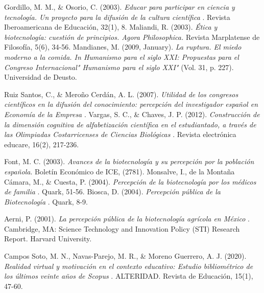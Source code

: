 \documentclass[12pt]{article}
\begin{document}
\newpage
{}
\begin{thebibliography}{X}
	 Gordillo, M. M., \& Osorio, C. (2003). \textit{ Educar para participar en ciencia y tecnología. Un proyecto para la difusión de la cultura científica }. Revista Iberoamericana de Educación, 32(1), 8.
	 Maliandi, R. (2003). \textit{ Ética y biotecnología: cuestión de principios. Agora Philosophica. } Revista Marplatense de Filosofía, 5(6), 34-56.
	 Mandianes, M. (2009, January). \textit{ La ruptura. El miedo moderno a la comida. In Humanismo para el siglo XXI: Propuestas para el Congreso Internacional" Humanismo para el siglo XXI" } (Vol. 31, p. 227). Universidad de Deusto.
	
	Ruiz Santos, C., \& Meroño Cerdán, A. L. (2007). \textit{ Utilidad de los congresos científicos en la difusión del conocimiento: percepción del investigador español en Economía de la Empresa }.
	Vargas, S. C., \& Chaves, J. P. (2012). \textit{ Construcción de la dimensión cognitiva de alfabetización científica en el estudiantado, a través de las Olimpiadas Costarricenses de Ciencias Biológicas }. Revista electrónica educare, 16(2), 217-236.
	
	Font, M. C. (2003). \textit{ Avances de la biotecnología y su percepción por la población española}. Boletín Económico de ICE, (2781).
	 Monsalve, I., de la Montaña Cámara, M., \& Cuesta, P. (2004). \textit{ Percepción de la biotecnología por los médicos de familia }. Quark, 51-56.
	 Biosca, D. (2004). \textit{ Percepción pública de la Biotecnología }. Quark, 8-9.
	
	Aerni, P. (2001). \textit{ La percepción pública de la biotecnología agrícola en México }. Cambridge, MA: Science Technology and Innovation Policy (STI) Research Report. Harvard University.
	
	 Campos Soto, M. N., Navas-Parejo, M. R., \& Moreno Guerrero, A. J. (2020). \textit{ Realidad virtual y motivación en el contexto educativo: Estudio bibliométrico de los últimos veinte años de Scopus }. ALTERIDAD. Revista de Educación, 15(1), 47-60.

\end{thebibliography}
\end{document}
